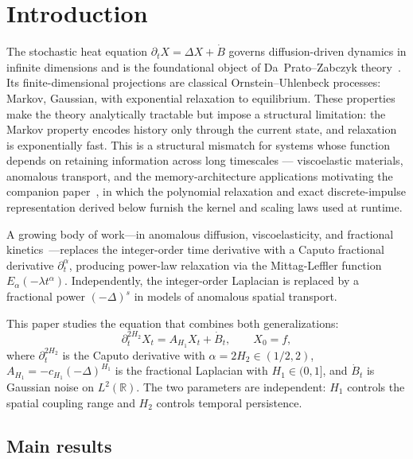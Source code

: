 \documentclass[11pt]{article}
\theoremstyle{definition}
\theoremstyle{remark}
\newcommand{\R}{\mathbb{R}}
\begin{document}
\section{Introduction}\label{sec:intro}

The stochastic heat equation
$\partial_t X = \Delta X + \dot{B}$ governs
diffusion-driven dynamics in infinite dimensions and
is the foundational object of Da~Prato--Zabczyk
theory~\cite{daprato2014}.  Its finite-dimensional
projections are classical Ornstein--Uhlenbeck
processes: Markov, Gaussian, with exponential
relaxation to equilibrium.  These properties make
the theory analytically tractable but impose a
structural limitation: the Markov property encodes
history only through the current state, and
relaxation is exponentially fast.  This is a
structural mismatch for systems whose function
depends on retaining information across long
timescales --- viscoelastic materials, anomalous
transport, and the memory-architecture applications
motivating the companion paper~\cite{fontes2026arch},
in which the polynomial relaxation and exact
discrete-impulse representation derived below
furnish the kernel and scaling laws used at
runtime.

A growing body of work---in anomalous diffusion,
viscoelasticity, and fractional
kinetics~\cite{mainardi2010,meerschaert2012}---replaces
the integer-order time derivative with a Caputo
fractional derivative $\partial_t^\alpha$, producing
power-law relaxation via the Mittag-Leffler function
$E_\alpha(-\lambda t^\alpha)$.  Independently, the
integer-order Laplacian is replaced by a fractional
power $(-\Delta)^s$ in models of anomalous
spatial transport.

This paper studies the equation that combines both
generalizations:
\begin{equation}\label{eq:quijotic_main}
\partial_t^{2H_2} X_t = A_{H_1} X_t + \dot{B}_t,
\qquad X_0 = f,
\end{equation}
where $\partial_t^{2H_2}$ is the Caputo derivative
with $\alpha = 2H_2 \in (1/2, 2)$,
$A_{H_1} = -c_{H_1}(-\Delta)^{H_1}$ is the
fractional Laplacian with $H_1 \in (0,1]$, and
$\dot{B}_t$ is Gaussian noise on $L^2(\R)$.
The two parameters are independent: $H_1$ controls
the spatial coupling range and $H_2$ controls
temporal persistence.

\subsection{Main results}
\end{document}
